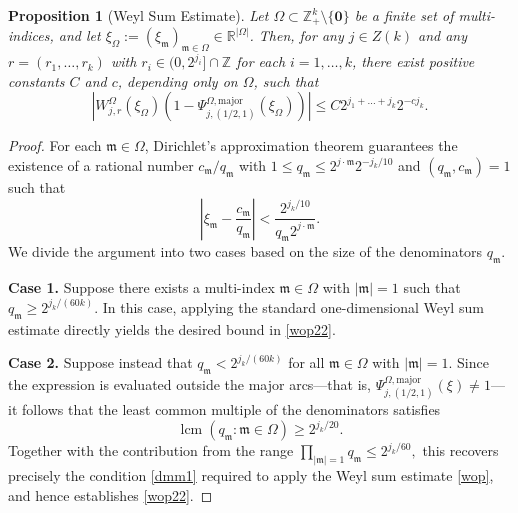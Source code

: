 \documentclass[10pt,a4paper]{amsart}
\newtheorem{proposition}{Proposition}\numberwithin{proposition}{section}
\numberwithin{equation}{section}
\begin{document}
 \begin{proposition}[Weyl Sum Estimate]\label{ws1}
Let $\Omega \subset \mathbb{Z}_+^k \setminus \{\mathbf{0}\}$ be a finite set of multi-indices, and let $\xi_{\Omega} := (\xi_{\mathfrak{m}})_{\mathfrak{m} \in \Omega} \in \mathbb{R}^{|\Omega|}$.   Then, for any $j \in  Z(k)$ and any $r = (r_1, \dots, r_k)$ with $r_i \in (0, 2^{j_i}] \cap \mathbb{Z}$ for each $i = 1, \dots, k$, there exist positive constants $C$ and $c$, depending only on $\Omega$, such that
\begin{equation}\label{wop22}
\left| W_{j,r}^{\Omega}(\xi_\Omega) \left( 1 - \Psi_{j,(1/2,1)}^{\Omega,\mathrm{major}}(\xi_{\Omega}) \right) \right| \le C 2^{j_1 + \dots + j_k} 2^{-c j_k}.
\end{equation}
\end{proposition}

\begin{proof}
For each $\mathfrak{m} \in \Omega$, Dirichlet's approximation theorem guarantees the existence of a rational number $c_{\mathfrak{m}}/q_{\mathfrak{m}}$ with $1 \le q_{\mathfrak{m}} \le 2^{j \cdot \mathfrak{m}} 2^{-j_k/10}$ and $(q_{\mathfrak{m}}, c_{\mathfrak{m}}) = 1$ such that
\[
\left| \xi_{\mathfrak{m}} - \frac{c_{\mathfrak{m}}}{q_{\mathfrak{m}}} \right| < \frac{2^{j_k/10}}{q_{\mathfrak{m}} 2^{j \cdot \mathfrak{m}}}.
\]
We divide the argument into two cases based on the size of the denominators $q_{\mathfrak{m}}$.

\medskip
\noindent\textbf{Case 1.} Suppose there exists a multi-index $\mathfrak{m} \in \Omega$ with $|\mathfrak{m}| = 1$ such that $q_{\mathfrak{m}} \ge 2^{j_k/(60k)} $. In this case, applying the standard one-dimensional Weyl sum estimate directly yields the desired bound in \eqref{wop22}.

\medskip
\noindent\textbf{Case 2.} Suppose instead that $q_{\mathfrak{m}} < 2^{j_k/(60k)} $ for all $\mathfrak{m} \in \Omega$ with $|\mathfrak{m}| = 1$. Since the expression is evaluated outside the major arcs—that is, $\Psi_{j,(1/2,1)}^{\Omega,\mathrm{major}}(\xi) \neq 1$—it follows that the least common multiple of the denominators satisfies
\[
\operatorname{lcm}(q_{\mathfrak{m}} : \mathfrak{m} \in \Omega) \ge 2^{j_k/20}.
\]
Together with the contribution from the range
$\prod_{|\mathfrak{m}|=1} q_{\mathfrak{m}}
\leq 2^{j_k/60},$
this recovers precisely the condition \eqref{dmm1} required to apply the
Weyl sum estimate \eqref{wop}, and hence establishes \eqref{wop22}.




\end{proof}
 
\end{document}
